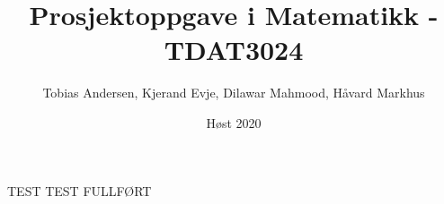 \documentclass{article}
\title{Prosjektoppgave i Matematikk - TDAT3024}
\author{Tobias Andersen, Kjerand Evje, Dilawar Mahmood, Håvard Markhus}
\date{Høst 2020}
\begin{document}
\maketitle
TEST
TEST FULLFØRT
\newpage
\tableofcontents
\newpage
\end{document}
